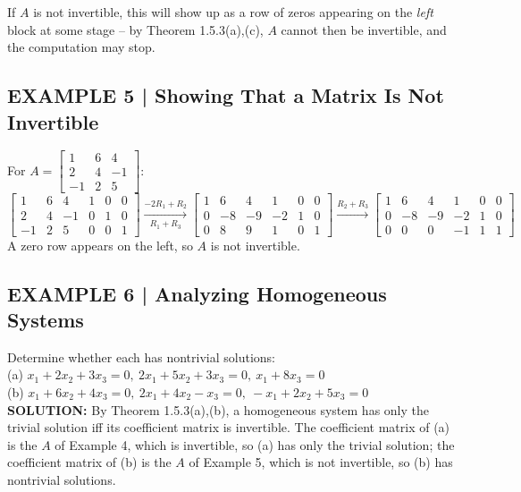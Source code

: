 \documentclass{article}
\theoremstyle{mystyle}
\begin{document}
If $A$ is not invertible, this will show up as a row of zeros appearing on the \emph{left} block at some stage -- by Theorem 1.5.3(a),(c), $A$ cannot then be invertible, and the computation may stop.

\subsection*{EXAMPLE 5 | Showing That a Matrix Is Not Invertible}
For $A=\begin{bmatrix}1&6&4\\2&4&-1\\-1&2&5\end{bmatrix}$:
\[
\left[\begin{array}{ccc|ccc}1&6&4&1&0&0\\2&4&-1&0&1&0\\-1&2&5&0&0&1\end{array}\right]
\xrightarrow[R_1+R_3]{-2R_1+R_2}
\left[\begin{array}{ccc|ccc}1&6&4&1&0&0\\0&-8&-9&-2&1&0\\0&8&9&1&0&1\end{array}\right]
\xrightarrow{R_2+R_3}
\left[\begin{array}{ccc|ccc}1&6&4&1&0&0\\0&-8&-9&-2&1&0\\0&0&0&-1&1&1\end{array}\right]
\]
A zero row appears on the left, so $A$ is not invertible.

\subsection*{EXAMPLE 6 | Analyzing Homogeneous Systems}
Determine whether each has nontrivial solutions: \\
(a) $x_1+2x_2+3x_3=0,\ 2x_1+5x_2+3x_3=0,\ x_1+8x_3=0$\qquad \\
(b) $x_1+6x_2+4x_3=0,\ 2x_1+4x_2-x_3=0,\ -x_1+2x_2+5x_3=0$ \\

\textbf{SOLUTION:} By Theorem 1.5.3(a),(b), a homogeneous system has only the trivial solution iff its coefficient matrix is invertible. The coefficient matrix of (a) is the $A$ of Example 4, which is invertible, so (a) has only the trivial solution; the coefficient matrix of (b) is the $A$ of Example 5, which is not invertible, so (b) has nontrivial solutions.
\end{document}
